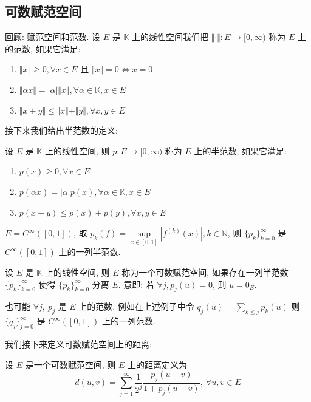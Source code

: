 \documentclass[11pt]{ctexart}[UTF8]
\begin{document}
\subsection{可数赋范空间}
回顾: 赋范空间和范数. 设 $E$ 是 $\mathbb{K}$ 上的线性空间我们把 $\Vert \cdot \Vert: E \longrightarrow [0, \infty)$ 称为 $E$ 上的范数, 如果它满足:
\begin{enumerate}
    \item $\Vert x \Vert \geq 0, \forall x \in E$ 且 $\Vert x \Vert = 0 \Leftrightarrow x = 0$
    \item $\Vert \alpha x \Vert = |\alpha| \Vert x \Vert, \forall \alpha \in \mathbb{K}, x \in E$
    \item $\Vert x + y \Vert \leq \Vert x \Vert + \Vert y \Vert, \forall x, y \in E$
\end{enumerate}
接下来我们给出半范数的定义:
\begin{definition}[半范数]
    设 $E$ 是 $\mathbb{K}$ 上的线性空间, 则 $p: E \longrightarrow [0, \infty)$ 称为 $E$ 上的半范数, 如果它满足:
\begin{enumerate}
    \item $p(x) \geq 0, \forall x \in E$
    \item $p(\alpha x) = |\alpha| p(x), \forall \alpha \in \mathbb{K}, x \in E$
    \item $p(x + y) \leq p(x) + p(y), \forall x, y \in E$
\end{enumerate}
\end{definition}
\begin{example}
    $E = C^{\infty}([0,1])$, 取 $p_{k}(f) = \sup\limits_{x \in [0,1]} |f^{(k)}(x)|, k \in \mathbb{N}$, 则 $\{p_{k}\}_{k=0}^{\infty}$ 是 $C^{\infty}([0,1])$ 上的一列半范数.
\end{example}
\begin{definition}[可数赋范空间]
    设 $E$ 是 $\mathbb{K}$ 上的线性空间, 则 $E$ 称为一个可数赋范空间, 如果存在一列半范数 $\{p_{k}\}_{k=0}^{\infty}$ 使得 $\{p_{k}\}_{k=0}^{\infty}$ 分离 $E$. 意即: 若
    $\forall j, p_j(u) = 0$, 则 $u = 0_{E}$.
\end{definition}
\begin{remark}
    也可能 $\forall j,\ p_{j}$ 是 $E$ 上的范数. 例如在上述例子中令 $q_{j}(u) = \sum\limits_{k\leq j} p_{k}(u)$ 则 $\{q_{j}\}_{j=0}^{\infty}$ 是 $C^{\infty}([0,1])$ 上的一列范数.
\end{remark}
我们接下来定义可数赋范空间上的距离:
\begin{definition}
    设 $E$ 是一个可数赋范空间, 则 $E$ 上的距离定义为
\begin{equation*}
    d(u,v) = \sum\limits_{j=1}^{\infty} \frac{1}{2^j} \frac{p_j(u-v)}{1+p_j(u-v)},\ \forall u,v \in E
\end{equation*}
\end{definition}
\end{document}
